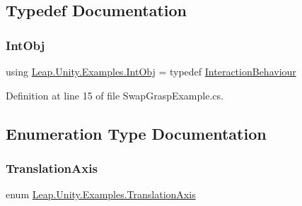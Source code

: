 \subsection{Typedef Documentation}
\mbox{\label{namespace_leap_1_1_unity_1_1_examples_a009a8c553109ae98a972c43c460d0041}} 
\subsubsection{\texorpdfstring{IntObj}{IntObj}}
{\footnotesize\ttfamily using \mbox{\hyperlink{namespace_leap_1_1_unity_1_1_examples_a009a8c553109ae98a972c43c460d0041}{Leap.\+Unity.\+Examples.\+Int\+Obj}} = typedef \mbox{\hyperlink{class_leap_1_1_unity_1_1_interaction_1_1_interaction_behaviour}{Interaction\+Behaviour}}}



Definition at line 15 of file Swap\+Grasp\+Example.\+cs.



\subsection{Enumeration Type Documentation}
\mbox{\label{namespace_leap_1_1_unity_1_1_examples_a76ed01cc0aaa8ede4fc75e38919a60a5}} 
\subsubsection{\texorpdfstring{TranslationAxis}{TranslationAxis}}
{\footnotesize\ttfamily enum \mbox{\hyperlink{namespace_leap_1_1_unity_1_1_examples_a76ed01cc0aaa8ede4fc75e38919a60a5}{Leap.\+Unity.\+Examples.\+Translation\+Axis}}\hspace{0.3cm}{\ttfamily [strong]}}

